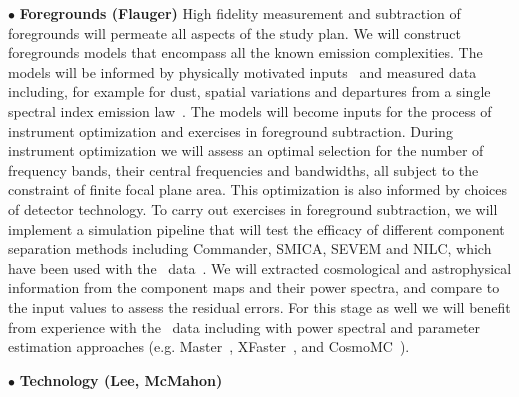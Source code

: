 $\bullet$ {\bf Foregrounds (Flauger) } \hspace{0.1in} High fidelity measurement and subtraction of foregrounds will 
permeate all aspects of the study plan. We will construct foregrounds models that encompass all the known emission 
complexities. The models will be informed by physically motivated inputs~\cite{Bruce+Fraisse2009,Hensley_etal} 
and measured data including, for example for dust, spatial variations and departures from a single spectral index 
emission law~\cite{Planck2015-X;Planck2015-L;Planck2015-XXIX;Boulanger2016}. The models will become inputs
for the process of instrument optimization and exercises in foreground subtraction. During instrument optimization 
we will assess an optimal selection for the number of frequency bands, their central frequencies and bandwidths, all 
subject to the constraint of finite focal plane area. This optimization is also informed by choices of detector technology. 
To carry out exercises in foreground subtraction, we will implement a simulation pipeline that will test the efficacy 
of different component separation methods including Commander, SMICA, SEVEM and NILC, which have been 
used with the \planck\ data~\cite{Planck2015-IX}. We will extracted cosmological and astrophysical information 
from the component maps and their power spectra, and compare to the input values to assess the residual 
errors. For this stage as well we will benefit from experience with the \planck\ data including with power 
spectral and parameter estimation approaches (e.g. Master~\cite{}, XFaster~\cite{}, and CosmoMC~\cite{}). 

$\bullet$ {\bf Technology (Lee, McMahon)} \hspace{0.1in}











